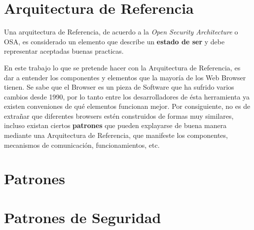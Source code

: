 \section{Arquitectura de Referencia}
\label{chap2:ArqRef}

Una arquitectura de Referencia, de acuerdo a la \textit{Open Security Architecture} o OSA\cite{openSecArch}, es considerado un elemento que describe un \textbf{estado de ser} y debe representar aceptadas buenas practicas. 

En este trabajo lo que se pretende hacer con la Arquitectura de Referencia, es dar a entender los componentes y elementos que la mayoría de los Web Browser tienen. Se sabe que el Browser es un pieza de Software que ha sufrido varios cambios desde 1990, por lo tanto entre los desarrolladores de ésta herramienta ya existen conveniones de qué elementos funcionan mejor. Por consiguiente, no es de extrañar que diferentes browsers estén construidos de formas muy similares, incluso existan ciertos \textbf{patrones} que pueden explayarse de buena manera mediante una Arquitectura de Referencia, que manifeste los componentes, mecanismos de comunicación, funcionamientos, etc.

\section{Patrones}
\label{chap2:Patt}

\section{Patrones de Seguridad}
\label{chap2:SecPatt}

